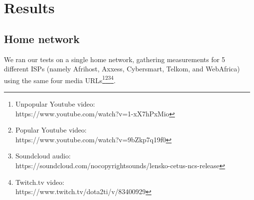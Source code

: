 \documentclass{sig-alternate-05-2015}
\begin{document}
\section{Results}\label{sec:results}
\subsection{Home network}


We ran our tests on a single home network, gathering measurements for 5 different ISPs (namely Afrihost, Axxess, Cybersmart, Telkom, and WebAfrica) using the same four media URLs\footnote{Unpopular Youtube video: \\ https://www.youtube.com/watch?v=1-xX7hPxMio}\footnote{Popular Youtube video: \\ https://www.youtube.com/watch?v=9bZkp7q19f0}\footnote{Soundcloud audio: \\ https://soundcloud.com/nocopyrightsounds/lensko-cetus-ncs-release}\footnote{Twitch.tv video: \\https://www.twitch.tv/dota2ti/v/83400929}.
\end{document}
